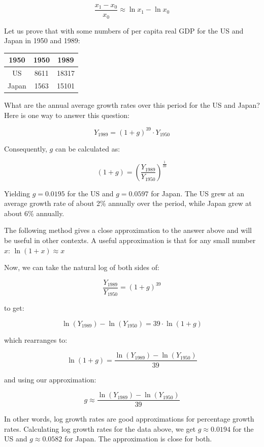 \documentclass[
  12pt,
  oneside]{book}
\theoremstyle{definition}
\theoremstyle{definition}
\theoremstyle{definition}
\theoremstyle{definition}
\theoremstyle{remark}
\begin{document}
\[
\frac{x_1 - x_0}{x_0} \approx \ln x_1 - \ln x_0
\]

Let us prove that with some numbers of per capita real GDP for the US and Japan in 1950 and 1989:

\begin{center}
    \begin{tabular}{ccc}\toprule
        1950 & 1950 & 1989 \\ \midrule
        US & 8611 & 18317 \\ 
        Japan & 1563 & 15101 \\ \bottomrule
    \end{tabular} 
\end{center}

What are the annual average growth rates over this period for the US and Japan? Here is one way to answer this question:

\[
Y_{1989} = (1 + g)^{39} \cdot Y_{1950}
\]

Consequently, \(g\) can be calculated as:

\[
(1 + g) = \left(\frac{Y_{1989}}{Y_{1950}}\right)^{\frac{1}{39}}
\]

Yielding \(g = 0.0195\) for the US and \(g = 0.0597\) for Japan. The US grew at an average growth rate of about 2\% annually over the period, while Japan grew at about 6\% annually.

The following method gives a close approximation to the answer above and will be useful in other contexts. A useful approximation is that for any small number \(x\): \(\ln (1 + x) \approx x\)

Now, we can take the natural log of both sides of:

\[
\frac{Y_{1989}}{Y_{1950}} = (1 + g)^{39}
\]

to get:

\[
\ln (Y_{1989}) - \ln (Y_{1950}) = 39 \cdot \ln (1 + g)
\]

which rearranges to:

\[
\ln (1 + g) = \frac{\ln (Y_{1989}) - \ln (Y_{1950})}{39}
\]

and using our approximation:

\[
g \approx \frac{\ln (Y_{1989}) - \ln (Y_{1950})}{39}
\]

In other words, log growth rates are good approximations for percentage growth rates. Calculating log growth rates for the data above, we get \(g \approx 0.0194\) for the US and \(g \approx 0.0582\) for Japan. The approximation is close for both.
\end{document}
